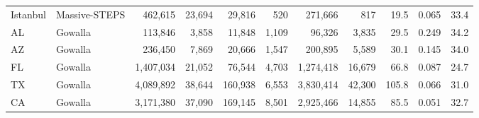 \begin{table}[htbp]
\begin{adjustbox}{max width=\textwidth}
\begin{tabular}{l l r r r r r r r r r}
\midrule
Istanbul & Massive-STEPS &   462{,}615 & 23{,}694 &  29{,}816 &     520 &   271{,}666 &     817 &  19.5 & 0.065 & 33.4 \\
AL       & Gowalla       &   113{,}846 &  3{,}858 &  11{,}848 & 1{,}109 &    96{,}326 & 3{,}835 &  29.5 & 0.249 & 34.2 \\
AZ       & Gowalla       &   236{,}450 &  7{,}869 &  20{,}666 & 1{,}547 &   200{,}895 & 5{,}589 &  30.1 & 0.145 & 34.0 \\
FL       & Gowalla       & 1{,}407{,}034 & 21{,}052 &  76{,}544 & 4{,}703 & 1{,}274{,}418 & 16{,}679 &  66.8 & 0.087 & 24.7 \\
TX       & Gowalla       & 4{,}089{,}892 & 38{,}644 & 160{,}938 & 6{,}553 & 3{,}830{,}414 & 42{,}300 & 105.8 & 0.066 & 31.0 \\
CA       & Gowalla       & 3{,}171{,}380 & 37{,}090 & 169{,}145 & 8{,}501 & 2{,}925{,}466 & 14{,}855 &  85.5 & 0.051 & 32.7 \\
\bottomrule
\end{tabular}
\end{adjustbox}
\end{table}
